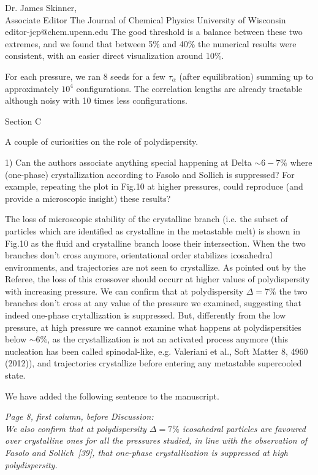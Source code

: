 \documentclass[a4paper, rebuttal, parskip=true, firsthead=false, fromemail=false, foldmarks=false]{scrlttr2}
\begin{document}
\begin{letter}{Dr. James Skinner,\\Associate Editor
The Journal of Chemical Physics
University of Wisconsin\\
editor-jcp@chem.upenn.edu }
The good threshold is a balance between these two extremes, and we found that between 5\% and 40\% the numerical results were consistent, with an easier direct visualization around 10\%.

For each pressure, we ran 8 seeds for a few $\tau_\alpha$ (after equilibration) summing up to approximately $10^4$ configurations. The correlation lengths are already tractable although noisy with 10 times less configurations.

\begin{quotationi}
Section C

A couple of curiosities on the role of polydispersity.

1) Can the authors associate anything special happening at Delta $\sim6-7\%$ where (one-phase) crystallization according to Fasolo and Sollich is suppressed? For example, repeating the plot in Fig.10 at higher pressures, could reproduce (and provide a microscopic insight) these results?
\end{quotationi}

The loss of microscopic stability of the crystalline branch (i.e. the subset of particles which are identified as crystalline in the metastable melt)
is shown in Fig.10 as the fluid and crystalline branch loose their intersection. When the two branches don't cross anymore, orientational order
stabilizes icosahedral environments, and trajectories are not seen to crystallize. As pointed out by the Referee,
the loss of this crossover should occurr at higher values of polydispersity with
increasing pressure. We can confirm that at polydispersity $\Delta=7\%$ the two branches don't cross at any value of the pressure we examined, suggesting
that indeed one-phase crytallization is suppressed. But, differently from the low pressure, at high pressure we cannot examine
what happens at polydispersities below $\sim 6\%$, as the crystallization is not an activated process anymore
(this nucleation has been called spinodal-like, e.g. Valeriani et al., Soft Matter 8, 4960 (2012)), and trajectories crystallize
before entering any metastable supercooled state.

We have added the following sentence to the manuscript.

{\it Page 8, first column, before Discussion:\\
We also confirm that at polydispersity $\Delta=7\%$ icosahedral particles are favoured over crystalline ones for
all the pressures studied, in line with the observation of Fasolo and Sollich~[39], that
one-phase crystallization is suppressed at high polydispersity.
}




\end{letter}
\end{document}
